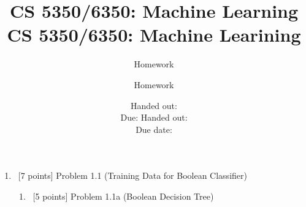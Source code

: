 \documentclass[8pt, fullpage,letterpaper]{article}
\title{CS 5350/6350: Machine Learning \semester}
\author{Homework \assignmentId}
\date{Handed out: \releaseDate\\
	Due: \dueDate}
\title{CS 5350/6350: Machine Learining \semester}
\author{Homework \assignmentId}
\date{Handed out: \releaseDate\\
  Due date: \dueDate}
\begin{document}



\begin{enumerate}
\item~[7 points] Problem 1.1 (Training Data for Boolean Classifier)
\begin{enumerate}
\item~[5 points] Problem 1.1a (Boolean Decision Tree)

	\color{violet}
	\begin{enumerate}


\end{enumerate}
\end{enumerate}
\end{enumerate}
\end{document}
